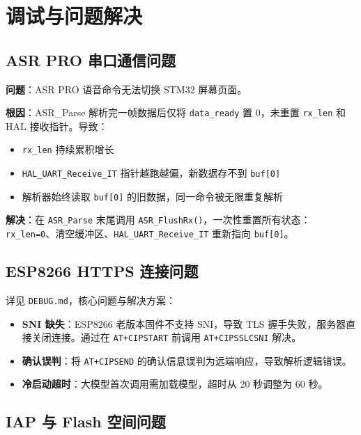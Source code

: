 \documentclass[12pt,a4paper]{ctexart}
\begin{document}
\section{调试与问题解决}

\subsection{ASR PRO 串口通信问题}

\textbf{问题}：ASR PRO 语音命令无法切换 STM32 屏幕页面。

\textbf{根因}：ASR\_Parse 解析完一帧数据后仅将 \texttt{data\_ready} 置 0，未重置 \texttt{rx\_len} 和 HAL 接收指针。导致：
\begin{itemize}
    \item \texttt{rx\_len} 持续累积增长
    \item \texttt{HAL\_UART\_Receive\_IT} 指针越跑越偏，新数据存不到 \texttt{buf[0]}
    \item 解析器始终读取 \texttt{buf[0]} 的旧数据，同一命令被无限重复解析
\end{itemize}

\textbf{解决}：在 \texttt{ASR\_Parse} 末尾调用 \texttt{ASR\_FlushRx()}，一次性重置所有状态：\texttt{rx\_len=0}、清空缓冲区、\texttt{HAL\_UART\_Receive\_IT} 重新指向 \texttt{buf[0]}。

\subsection{ESP8266 HTTPS 连接问题}

详见 \texttt{DEBUG.md}，核心问题与解决方案：
\begin{itemize}
    \item \textbf{SNI 缺失}：ESP8266 老版本固件不支持 SNI，导致 TLS 握手失败，服务器直接关闭连接。通过在 \texttt{AT+CIPSTART} 前调用 \texttt{AT+CIPSSLCSNI} 解决。
    \item \textbf{确认误判}：将 \texttt{AT+CIPSEND} 的确认信息误判为远端响应，导致解析逻辑错误。
    \item \textbf{冷启动超时}：大模型首次调用需加载模型，超时从 20 秒调整为 60 秒。
\end{itemize}

\subsection{IAP 与 Flash 空间问题}
\end{document}
